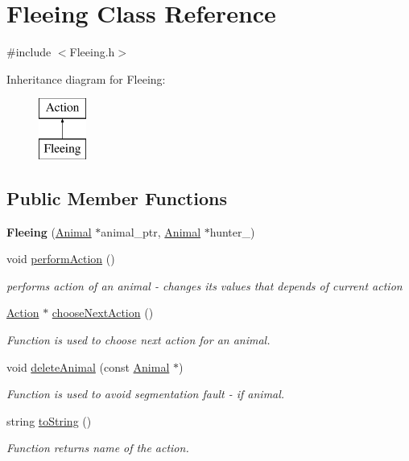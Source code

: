 \hypertarget{class_fleeing}{}\section{Fleeing Class Reference}
\label{class_fleeing}


{\ttfamily \#include $<$Fleeing.\+h$>$}

Inheritance diagram for Fleeing\+:\begin{figure}[H]
\begin{center}
\leavevmode
\includegraphics[height=2.000000cm]{class_fleeing}
\end{center}
\end{figure}
\subsection*{Public Member Functions}
\begin{DoxyCompactItemize}
\item 
\hypertarget{class_fleeing_a0e1cbc5c9818c27f88543e2cfbd6c71c}{}{\bfseries Fleeing} (\hyperlink{class_animal}{Animal} $\ast$animal\+\_\+ptr, \hyperlink{class_animal}{Animal} $\ast$hunter\+\_\+)\label{class_fleeing_a0e1cbc5c9818c27f88543e2cfbd6c71c}

\item 
void \hyperlink{class_fleeing_afe47ee936d28b2508c9f833080453b64}{perform\+Action} ()
\begin{DoxyCompactList}\small\item\em performs action of an animal -\/ changes it\textquotesingle{}s values that depends of current action \end{DoxyCompactList}\item 
\hyperlink{class_action}{Action} $\ast$ \hyperlink{class_fleeing_a07c3b3096f885a5a4f11d9bdd7e57c6f}{choose\+Next\+Action} ()
\begin{DoxyCompactList}\small\item\em Function is used to choose next action for an animal. \end{DoxyCompactList}\item 
void \hyperlink{class_fleeing_a2d79eadf6416380fbe0183ca289f5686}{delete\+Animal} (const \hyperlink{class_animal}{Animal} $\ast$)
\begin{DoxyCompactList}\small\item\em Function is used to avoid segmentation fault -\/ if animal. \end{DoxyCompactList}\item 
string \hyperlink{class_fleeing_ab0ef11dd8f35cbca7c8157e3ae83f7f0}{to\+String} ()
\begin{DoxyCompactList}\small\item\em Function returns name of the action. \end{DoxyCompactList}\end{DoxyCompactItemize}
